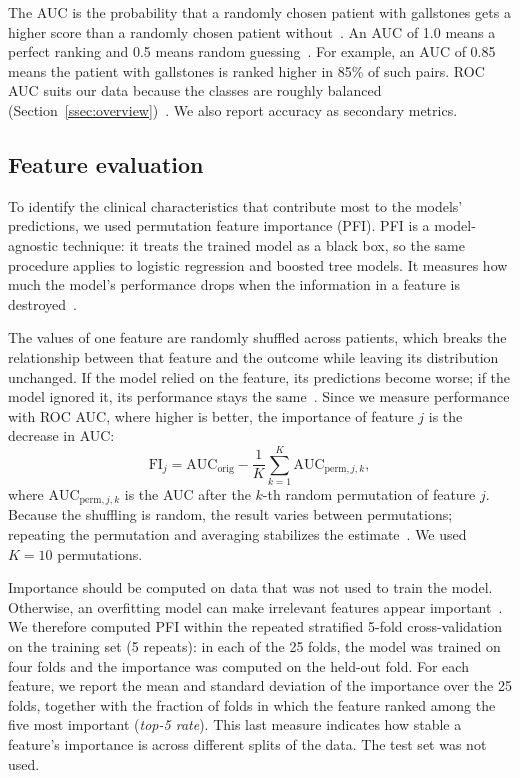 \documentclass[conference]{IEEEtran}
\begin{document}
The AUC is the probability that a randomly chosen patient with gallstones gets a
higher score than a randomly chosen patient without~\cite{hanley1982meaning}. An
AUC of 1.0 means a perfect ranking and 0.5 means random
guessing~\cite{google_rocauc}. For example, an AUC of 0.85 means the patient with
gallstones is ranked higher in 85\% of such pairs. ROC AUC suits our data
because the classes are roughly balanced (Section~\ref{ssec:overview})~\cite{google_rocauc}.
We also report accuracy as secondary metrics.

\subsection{Feature evaluation}
\label{ssec:feature_evaluation}

To identify the clinical characteristics that contribute most to the models'
predictions, we used permutation feature importance (PFI). PFI is a
model-agnostic technique: it treats the trained model as a black box, so the
same procedure applies to logistic regression and boosted tree models. It
measures how much the model's performance drops when the information in a
feature is destroyed~\cite{molnar2025}.

The values of one feature are randomly shuffled across
patients, which breaks the relationship between that feature and the outcome
while leaving its distribution unchanged. If the model relied on the feature,
its predictions become worse; if the model ignored it, its performance stays
the same~\cite{molnar2025}. Since we measure performance with ROC AUC, where
higher is better, the importance of feature $j$ is the decrease in AUC:
\begin{equation}
\mathrm{FI}_j = \mathrm{AUC}_{\mathrm{orig}}
  - \frac{1}{K}\sum_{k=1}^{K} \mathrm{AUC}_{\mathrm{perm},j,k},
\end{equation}
where $\mathrm{AUC}_{\mathrm{perm},j,k}$ is the AUC after the $k$-th random
permutation of feature $j$. Because the shuffling is random, the result varies
between permutations; repeating the permutation and averaging stabilizes the
estimate~\cite{molnar2025}. We used $K = 10$ permutations.

Importance should be computed on data that was not used to train the model.
Otherwise, an overfitting model can make irrelevant features appear
important~\cite{molnar2025}. We therefore computed PFI within the repeated
stratified 5-fold cross-validation on the training set (5 repeats): in each of
the 25 folds, the model was trained on four folds and the importance was
computed on the held-out fold. For each feature, we report the mean and
standard deviation of the importance over the 25 folds, together with the
fraction of folds in which the feature ranked among the five most important
(\emph{top-5 rate}). This last measure indicates how stable a feature's
importance is across different splits of the data. The test set was not used.
\end{document}
